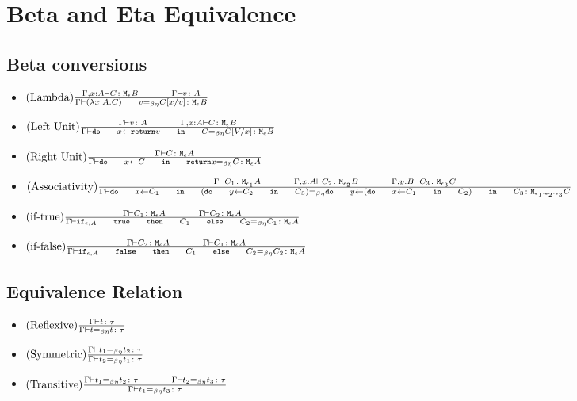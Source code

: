\documentclass{report}
\begin{document}
    \section{Beta and Eta Equivalence}
    \subsection{Beta conversions}
    \begin{itemize}
        \item $\treerule{Lambda}{\typerelation{\gax}{C}{\meb}\s\s \gtyperelation{v}{A}}{\gberelation{\apply{(\lam{x}{A}{C})}{v} }{ C\ssub{v}{x}}{\meb}}$
        
        \item $\treerule{Left Unit}{\gtyperelation{v}{A} \s\s \typerelation{\gax}{C}{\meb}}{\gberelation{\doin{x}{\return{v}}{C}}{C\ssub{x}{V}}{\meb}}$
        
        \item $\treerule{Right Unit}{\gtyperelation{C}{\mea}}{\gberelation{\doin{x}{C}{\return{x}} }{C}{\mea}}$
        \item $\treerule{Associativity}{\gtyperelation{C_1}{\M{\e_1}{A}} \s\s \typerelation{\gax}{C_2}{\M{\e_2}{B}}\s\s \typerelation{\gby}{C_3}{\M{\e_3}{C}}}{
            \gberelation{\doin{x}{C_1}{(\doin{y}{C_2}{C_3})}}{\doin{y}{(\doin{x}{C_1}{C_2})}{C_3}}{\M{\e_1 \dot \e_2 \dot \e_3}{C}}
        }$

        \item $\treerule{if-true}{\gtyperelation{C_1}{\mea}\s\s\gtyperelation{C_2}{\mea}}{\gberelation{\ifthenelse{\e}{A}{\t}{C_1}{C_2}}{C_1}{\mea}}$
        \item $\treerule{if-false}{\gtyperelation{C_2}{\mea}\s\s\gtyperelation{C_1}{\mea}}{\gberelation{\ifthenelse{\e}{A}{\f}{C_1}{C_2}}{C_2}{\mea}}$
        
    \end{itemize}
    \subsection{Equivalence Relation}
    \begin{itemize}
        \item $(\text{Reflexive}) \frac{\Gamma \vdash t \colon \tau}{\Gamma \vdash t =_{\beta\eta} t \colon \tau}$
        \item $(\text{Symmetric}) \frac{\Gamma \vdash t_1 =_{\beta\eta} t_2 \colon \tau}{\Gamma \vdash t_2 =_{\beta\eta} t_1 \colon \tau}$
        \item $\treerule{Transitive}{\gberelation{t_1}{t_2}{\tau}\s\s\gberelation{t_2}{t_3}{\tau}}{\gberelation{t_1}{t_3}{\tau}}$
    \end{itemize}
\end{document}
